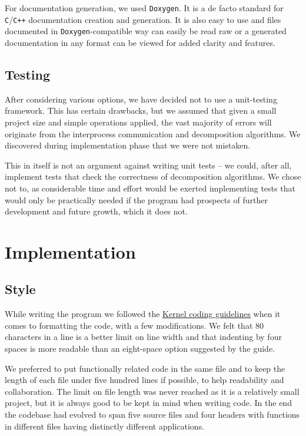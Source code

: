 \documentclass[11pt,a4paper]{article}
\begin{document}
For documentation generation, we used \texttt{Doxygen}. 
It is a de facto standard for \texttt{C}/\texttt{C++} documentation creation and generation. 
It is also easy to use and files documented in \texttt{Doxygen}-compatible way can easily be read raw or a generated documentation in any format can be viewed for added clarity and features.

\subsection{Testing}
After considering various options, we have decided not to use a unit-testing framework. 
This has certain drawbacks, but we assumed that given a small project size and simple operations applied, the vast majority of errors will originate from the interprocess communication and decomposition algorithms. 
We discovered during implementation phase that we were not mistaken. 

This in itself is not an argument against writing unit tests -- we could, after all, implement tests that check the correctness of decomposition algorithms.
We chose not to, as considerable time and effort would be exerted implementing tests that would only be practically needed if the program had prospects of further development and future growth, which it does not.

\section{Implementation}
\subsection{Style}
While writing the program we followed the \href{https://www.kernel.org/doc/Documentation/CodingStyle}{Kernel coding guidelines} when it comes to formatting the code, with a few modifications. 
We felt that 80 characters in a line is a better limit on line width and that indenting by four spaces is more readable than an eight-space option suggested by the guide. 

We preferred to put functionally related code in the same file and to keep the length of each file under five hundred lines if possible, to help readability and collaboration. 
The limit on file length was never reached as it is a relatively small project, but it is always good to be kept in mind when writing code.
In the end the codebase had evolved to span five source files and four headers with functions in different files having distinctly different applications.
\end{document}
